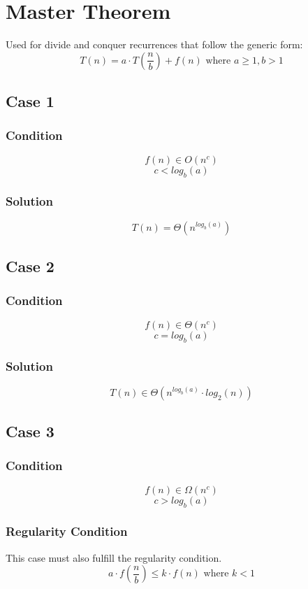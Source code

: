 \section{Master Theorem}
Used for divide and conquer recurrences that follow the generic form:
$$
T(n) = a \cdot T(\frac{n}{b}) + f(n) \text{ where } a \geq 1, b > 1
$$

\subsection{Case 1}

\subsubsection*{Condition}
$$
f(n) \in O(n^c)
$$
$$
c < log_b(a)
$$

\subsubsection*{Solution}
$$
T(n) = \Theta(n^{log_b(a)})
$$

\subsection{Case 2}

\subsubsection*{Condition}
$$
f(n) \in \Theta(n^c)
$$
$$
c = log_b(a)
$$

\subsubsection*{Solution}
$$
T(n) \in \Theta(n^{log_b(a)} \cdot log_2(n) )
$$

\subsection{Case 3}

\subsubsection*{Condition}
$$
f(n) \in \Omega(n^c)
$$
$$
c > log_b(a)
$$

\subsubsection*{Regularity Condition}
This case must also fulfill the regularity condition.
$$
a \cdot f(\frac{n}{b}) \leq k \cdot f(n) \text{ where } k < 1
$$

